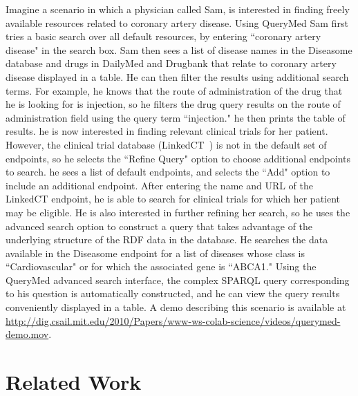 \documentclass{acm_proc_article-sp}
\begin{document}
Imagine a scenario in which a physician called Sam, is interested in finding freely available resources related to coronary artery disease.  Using QueryMed Sam first tries a basic search over all default resources, by entering ``coronary artery disease" in the search box. Sam then sees a list of disease names in the Diseasome database and drugs in DailyMed and Drugbank that relate to coronary artery disease displayed in a table.  He can then filter the results using additional search terms.  For example, he knows that the route of administration of the drug that he is looking for is injection, so he filters the drug query results on the route of administration field using the query term ``injection."  he then prints the table of results. he is now interested in finding relevant clinical trials for her patient.  However, the clinical trial database (LinkedCT~\cite{LinkedCT}) is not in the default set of endpoints, so he selects the ``Refine Query" option to choose additional endpoints to search.  he sees a list of default endpoints, and selects the ``Add" option to include an additional endpoint.  After entering the name and URL of the LinkedCT endpoint, he is able to search for clinical trials for which her patient may be eligible.  He is also interested in further refining her search, so he uses the advanced search option to construct a query that takes advantage of the underlying structure of the RDF data in the database.  He searches the data available in the Diseasome endpoint for a list of diseases whose class is ``Cardiovascular" or for which the associated gene is ``ABCA1."  Using the QueryMed advanced search interface, the complex SPARQL query corresponding to his question is automatically constructed, and he can view the query results conveniently displayed in a table. A demo describing this scenario is available at \url{http://dig.csail.mit.edu/2010/Papers/www-ws-colab-science/videos/querymed-demo.mov}.

\section{Related Work}
\label{related}
\end{document}
